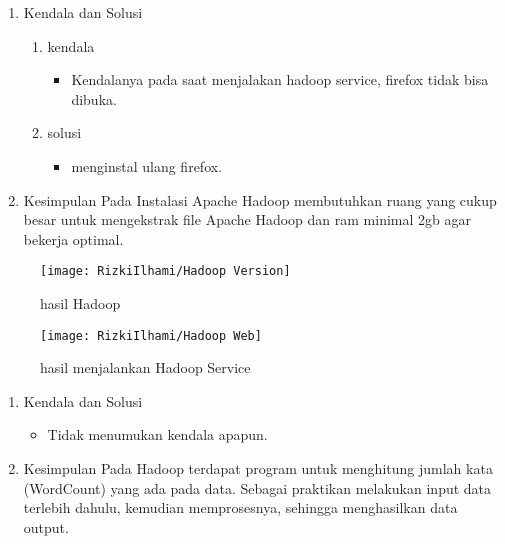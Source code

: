 

\begin{enumerate}

\item Kendala dan Solusi
\begin{enumerate}
    \item kendala
\begin{itemize}
    \item Kendalanya pada saat menjalakan hadoop service, firefox tidak bisa dibuka.
\end{itemize}
    \item solusi
\begin{itemize}
    \item menginstal ulang firefox.
\end{itemize}
\end{enumerate}

\item Kesimpulan
\newline
    Pada Instalasi Apache Hadoop membutuhkan ruang yang
    cukup besar untuk mengekstrak file Apache Hadoop dan ram
    minimal 2gb agar bekerja optimal.


\end{enumerate}

\begin{figure}[!ht]
    \texttt{[image: RizkiIlhami/Hadoop Version]}
    \caption{hasil Hadoop}
    \label{gam:Hasil}
\end{figure}

\begin{figure}[!ht]
    \texttt{[image: RizkiIlhami/Hadoop Web]}
    \caption{hasil menjalankan Hadoop Service}
    \label{gam:Hasil}
\end{figure}


\begin{enumerate}
\item Kendala dan Solusi

\begin{itemize}
\item Tidak menumukan kendala apapun.
\end{itemize}

\item Kesimpulan
\newline
    Pada Hadoop terdapat program untuk menghitung jumlah kata 
    (WordCount) yang ada pada data. Sebagai praktikan melakukan input data terlebih
    dahulu, kemudian memprosesnya, sehingga menghasilkan data output.

\end{enumerate}


